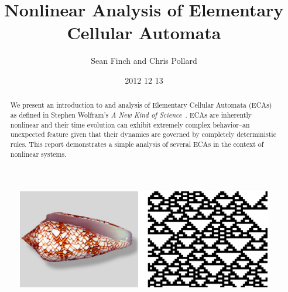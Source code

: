 \documentclass{article}
\author{Sean Finch and Chris Pollard}
\date{2012 12 13}
\title{Nonlinear Analysis of Elementary Cellular Automata}
\begin{document}
\maketitle

\vspace{0.5in}

\begin{figure}[h!]
    \centering
    \includegraphics[width=\textwidth]{shell-automata.eps}
\end{figure}

\vspace{0.5in}

\begin{abstract}
    We present an introduction to and analysis of Elementary Cellular
    Automata (ECAs) as defined in Stephen Wolfram's
    \emph{A New Kind of Science}~\cite{anks}.
    ECAs are inherently nonlinear and their time evolution can
    exhibit extremely complex behavior--an unexpected feature given
    that their dynamics are governed by completely deterministic
    rules.
    This report demonstrates a simple analysis of several ECAs in the
    context of nonlinear systems.
\end{abstract}

\newpage










\end{document}
